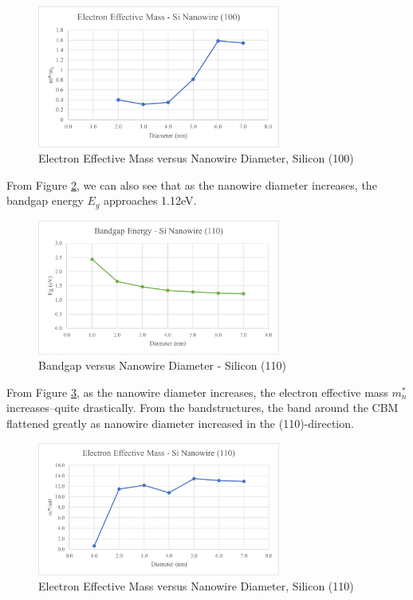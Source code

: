 \documentclass{IEEEtran}
\begin{document}
\begin{figure}[!ht] 
    \centering
    \includegraphics*[width = 8cm]{effmass-si-100.png}
    \caption{Electron Effective Mass versus Nanowire Diameter, Silicon (100)}
    \label{fig:effmass-si-100}
\end{figure}    


From Figure \ref{fig:bandgap-si-110}, we can also see that as the nanowire diameter increases, the bandgap energy \(E_g\) approaches 1.12eV.

\begin{figure}[!ht] 
    \centering
    \includegraphics*[width = 8cm]{bandgap-si-110.png}
    \caption{Bandgap versus Nanowire Diameter - Silicon (110)}
    \label{fig:bandgap-si-110}
\end{figure}    

From Figure \ref{fig:effmass-si-110}, as the nanowire diameter increases, the electron effective mass \(m_n^*\) increases--quite drastically. From the bandstructures, the band around the CBM flattened greatly as nanowire diameter increased in the (110)-direction. 

\begin{figure}[!ht] 
    \centering
    \includegraphics*[width = 8cm]{effmass-si-110.png}
    \caption{Electron Effective Mass versus Nanowire Diameter, Silicon (110)}
    \label{fig:effmass-si-110}
\end{figure}    
\end{document}
